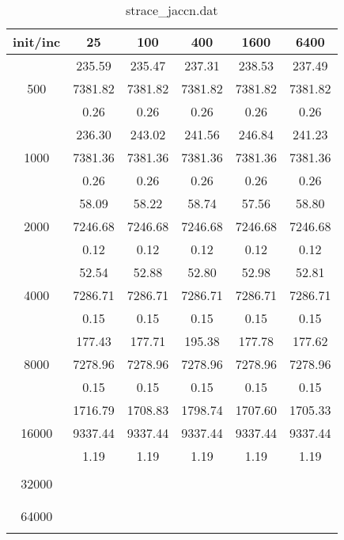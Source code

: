 \begin{table}[th]
\caption{strace\_jaccn.dat}
\label{tab:strace_jaccn.dat}
\centering
\begin{tabular}{|c||c|c|c|c|c|}
\hline
init/inc & 25 & 100 & 400 & 1600 & 6400 \\ \hline \hline
  & 235.59 & 235.47 & 237.31 & 238.53 & 237.49\\ 
500  & 7381.82 & 7381.82 & 7381.82 & 7381.82 & 7381.82\\ 
  & 0.26 & 0.26 & 0.26 & 0.26 & 0.26\\ \hline 
  & 236.30 & 243.02 & 241.56 & 246.84 & 241.23\\ 
1000  & 7381.36 & 7381.36 & 7381.36 & 7381.36 & 7381.36\\ 
  & 0.26 & 0.26 & 0.26 & 0.26 & 0.26\\ \hline 
  & 58.09 & 58.22 & 58.74 & 57.56 & 58.80\\ 
2000  & 7246.68 & 7246.68 & 7246.68 & 7246.68 & 7246.68\\ 
  & 0.12 & 0.12 & 0.12 & 0.12 & 0.12\\ \hline 
  & 52.54 & 52.88 & 52.80 & 52.98 & 52.81\\ 
4000  & 7286.71 & 7286.71 & 7286.71 & 7286.71 & 7286.71\\ 
  & 0.15 & 0.15 & 0.15 & 0.15 & 0.15\\ \hline 
  & 177.43 & 177.71 & 195.38 & 177.78 & 177.62\\ 
8000  & 7278.96 & 7278.96 & 7278.96 & 7278.96 & 7278.96\\ 
  & 0.15 & 0.15 & 0.15 & 0.15 & 0.15\\ \hline 
  & 1716.79 & 1708.83 & 1798.74 & 1707.60 & 1705.33\\ 
16000  & 9337.44 & 9337.44 & 9337.44 & 9337.44 & 9337.44\\ 
  & 1.19 & 1.19 & 1.19 & 1.19 & 1.19\\ \hline 
  &  &  &  &  & \\ 
32000  &  &  &  &  & \\ 
  &  &  &  &  & \\ \hline 
  &  &  &  &  & \\ 
64000  &  &  &  &  & \\ 
  &  &  &  &  & \\ \hline 
\end{tabular}
\end{table}


